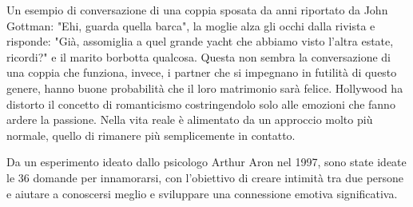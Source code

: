 \documentclass[12pt]{book} %
\begin{document}
Un esempio di conversazione di una coppia sposata da anni riportato da John Gottman: "Ehi, guarda
quella barca", la moglie alza gli occhi dalla rivista e risponde: "Già,
assomiglia a quel grande yacht che abbiamo visto l'altra estate, ricordi?" e
il marito borbotta qualcosa. Questa non sembra la conversazione di una coppia che funziona, invece, i partner che si
impegnano in futilità di questo genere, hanno buone probabilità che il loro matrimonio sarà felice.
Hollywood ha distorto il concetto di romanticismo costringendolo solo alle emozioni che fanno ardere la passione. Nella
vita reale è alimentato da un approccio molto più normale, quello di rimanere più semplicemente in contatto. 

Da un esperimento ideato dallo psicologo Arthur Aron nel 1997, sono state ideate le 36 domande per innamorarsi, con l'obiettivo di creare intimità tra due persone e aiutare a conoscersi meglio e sviluppare una connessione emotiva significativa. 
\end{document}
